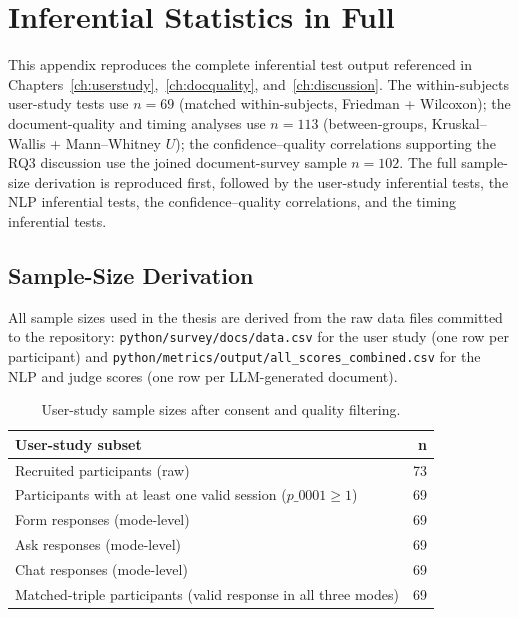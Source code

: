 \chapter{Inferential Statistics in Full}
\label{app:inferential}

This appendix reproduces the complete inferential test output
referenced in Chapters~\ref{ch:userstudy},~\ref{ch:docquality},
and~\ref{ch:discussion}. The within-subjects user-study tests
use $n = 69$ (matched within-subjects, Friedman + Wilcoxon); the
document-quality and timing analyses use $n = 113$ (between-groups,
Kruskal--Wallis + Mann--Whitney $U$); the confidence--quality
correlations supporting the RQ3 discussion use the joined
document-survey sample $n = 102$. The full sample-size derivation
is reproduced first, followed by the user-study inferential tests,
the NLP inferential tests, the confidence--quality correlations,
and the timing inferential tests.

\section{Sample-Size Derivation}
\label{app:samplesizes}

All sample sizes used in the thesis are derived from the raw data
files committed to the repository:
\texttt{python/survey/docs/data.csv} for the user study (one row per
participant) and \texttt{python/metrics/output/all\_scores\_combined.csv}
for the NLP and judge scores (one row per LLM-generated document).

\begin{table}[H]
\centering
\small
\begin{tabular}{lr}
\toprule
\textbf{User-study subset} & \textbf{n} \\
\midrule
Recruited participants (raw) & 73 \\
Participants with at least one valid session ($p\_0001 \geq 1$) & 69 \\
Form responses (mode-level) & 69 \\
Ask responses (mode-level) & 69 \\
Chat responses (mode-level) & 69 \\
Matched-triple participants (valid response in all three modes) & 69 \\
\bottomrule
\end{tabular}
\caption{User-study sample sizes after consent and quality filtering.}
\label{tab:n-survey}
\end{table}

